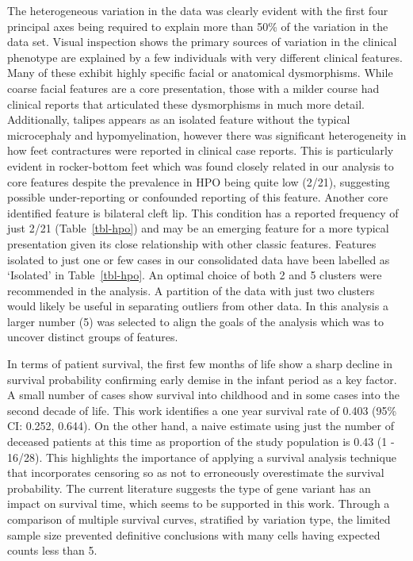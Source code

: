 \documentclass[
  authoryear,
  preprint,
  3p]{elsarticle}
\begin{document}
The heterogeneous variation in the data was clearly evident with the
first four principal axes being required to explain more than 50\% of
the variation in the data set. Visual inspection shows the primary
sources of variation in the clinical phenotype are explained by a few
individuals with very different clinical features. Many of these exhibit
highly specific facial or anatomical dysmorphisms. While coarse facial
features are a core presentation, those with a milder course had
clinical reports that articulated these dysmorphisms in much more
detail. Additionally, talipes appears as an isolated feature without the
typical microcephaly and hypomyelination, however there was significant
heterogeneity in how feet contractures were reported in clinical case
reports. This is particularly evident in rocker-bottom feet which was
found closely related in our analysis to core features despite the
prevalence in HPO being quite low (2/21), suggesting possible
under-reporting or confounded reporting of this feature. Another core
identified feature is bilateral cleft lip. This condition has a reported
frequency of just 2/21 (Table~\ref{tbl-hpo}) and may be an emerging
feature for a more typical presentation given its close relationship
with other classic features. Features isolated to just one or few cases
in our consolidated data have been labelled as `Isolated' in
Table~\ref{tbl-hpo}. An optimal choice of both 2 and 5 clusters were
recommended in the analysis. A partition of the data with just two
clusters would likely be useful in separating outliers from other data.
In this analysis a larger number (5) was selected to align the goals of
the analysis which was to uncover distinct groups of features.

In terms of patient survival, the first few months of life show a sharp
decline in survival probability confirming early demise in the infant
period as a key factor. A small number of cases show survival into
childhood and in some cases into the second decade of life. This work
identifies a one year survival rate of 0.403 (95\% CI: 0.252, 0.644). On
the other hand, a naive estimate using just the number of deceased
patients at this time as proportion of the study population is 0.43 (1 -
16/28). This highlights the importance of applying a survival analysis
technique that incorporates censoring so as not to erroneously
overestimate the survival probability. The current literature suggests
the type of gene variant has an impact on survival time, which seems to
be supported in this work. Through a comparison of multiple survival
curves, stratified by variation type, the limited sample size prevented
definitive conclusions with many cells having expected counts less than
5.
\end{document}

